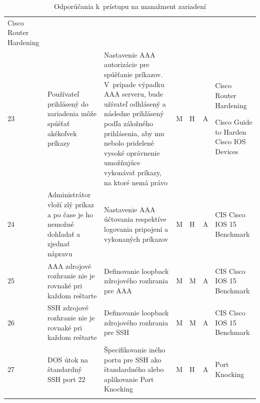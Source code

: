 \begin{longtable}[!htbp]{|C{2.5em}L{9em}L{9em}C{2em}C{2.5em}C{7.5em}L{10em}|}
	Cisco Router Hardening \cite{Graesser2001}	\\
	 23	&Používateľ prihlásený do zariadenia môže spúšťať akékoľvek príkazy	&Nastavenie AAA autorizácie pre spúšťanie príkazov. V~prípade výpadku AAA serveru, bude užívateľ odhlásený a následne prihlásený podľa  záložného prihlásenia, aby mu nebolo pridelené vysoké oprávnenie umožňujúce vykonávať príkazy, na ktoré nemá právo	&M	&H	&A	&Cisco Router Hardening \cite{Graesser2001}
	
	Cisco Guide to Harden Cisco IOS Devices \cite{Singh2018}	\\
	24	&Administrátor vloží zlý príkaz a po čase je ho nemožné dohľadať a zjednať nápravu	&Nastavenie AAA účtovania respektíve logovania pripojení a vykonaných príkazov	&M	&H	&A	&CIS Cisco IOS 15 Benchmark \cite{CIS_DrTLsgXv24lxeIIM}	\\
	 25	&AAA zdrojové rozhranie nie je rovnaké pri každom reštarte	&Definovanie loopback zdrojového rozhrania pre AAA	&M	&M	&A	&CIS Cisco IOS 15 Benchmark \cite{CIS_DrTLsgXv24lxeIIM}	\\
	26	&SSH zdrojové rozhranie nie je rovnaké pri každom reštarte	& Definovanie loopback zdrojového rozhrania pre SSH	&M	&M	&A	&CIS Cisco IOS 15 Benchmark \cite{CIS_DrTLsgXv24lxeIIM}	\\
	 27	&DOS útok na štandardný SSH port 22	&Špecifikovanie iného portu pre SSH ako štandardného alebo aplikovanie Port Knocking \cite{MJVmQiKUgZl92S8u}	&M	&H	&A	&Port Knocking \cite{MJVmQiKUgZl92S8u}	\\
	
	\hline
	\caption{Odporúčania k~prístupu na manažment zariadení}
	\label{tab:managemnet}%
\end{longtable}%

